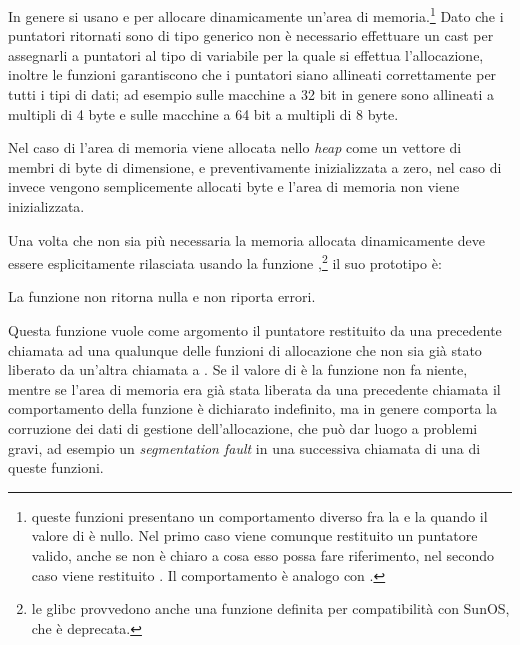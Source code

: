 In genere si usano  e  per allocare dinamicamente
un'area di memoria.\footnote{queste funzioni presentano un comportamento
  diverso fra la  e la  quando il valore di 
  è nullo.  Nel primo caso viene comunque restituito un puntatore valido,
  anche se non è chiaro a cosa esso possa fare riferimento, nel secondo caso
  viene restituito . Il comportamento è analogo con
  .}  Dato che i puntatori ritornati sono di tipo
generico non è necessario effettuare un cast per assegnarli a puntatori al
tipo di variabile per la quale si effettua l'allocazione, inoltre le funzioni
garantiscono che i puntatori siano allineati correttamente per tutti i tipi di
dati; ad esempio sulle macchine a 32 bit in genere sono allineati a multipli
di 4 byte e sulle macchine a 64 bit a multipli di 8 byte.

Nel caso di  l'area di memoria viene allocata nello \textit{heap}
come un vettore di  membri di  byte di dimensione, e
preventivamente inizializzata a zero, nel caso di  invece vengono
semplicemente allocati  byte e l'area di memoria non viene
inizializzata.

Una volta che non sia più necessaria la memoria allocata dinamicamente deve
essere esplicitamente rilasciata usando la funzione ,\footnote{le
  glibc provvedono anche una funzione  definita per compatibilità
  con SunOS, che è deprecata.} il suo prototipo è:

\begin{funcproto}{ 
}
{La funzione non ritorna nulla e non riporta errori.}
\end{funcproto}

Questa funzione vuole come argomento  il puntatore restituito da una
precedente chiamata ad una qualunque delle funzioni di allocazione che non sia
già stato liberato da un'altra chiamata a . Se il valore di
 è  la funzione non fa niente, mentre se l'area di
memoria era già stata liberata da una precedente chiamata il comportamento
della funzione è dichiarato indefinito, ma in genere comporta la corruzione
dei dati di gestione dell'allocazione, che può dar luogo a problemi gravi, ad
esempio un \textit{segmentation fault} in una successiva chiamata di una di
queste funzioni.


